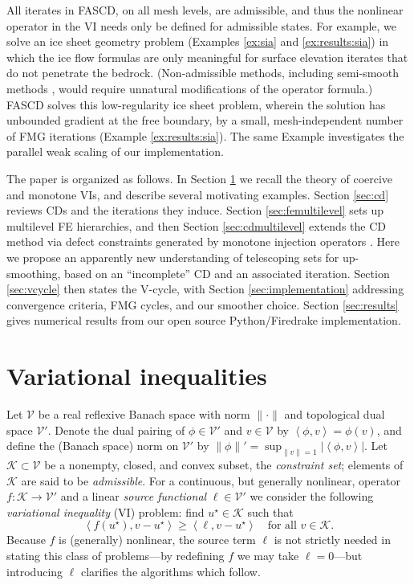 \documentclass[review,hidelinks,onefignum,onetabnum]{siamart220329}
\newcommand{\cK}{\mathcal{K}}
\newcommand{\cV}{\mathcal{V}}
\newcommand{\ip}[2]{\left<#1,#2\right>}
\begin{document}
All iterates in FASCD, on all mesh levels, are admissible, and thus the nonlinear operator in the VI needs only be defined for admissible states.  For example, we solve an ice sheet geometry problem (Examples \ref{ex:sia} and \ref{ex:results:sia}) in which the ice flow formulas are only meaningful for surface elevation iterates that do not penetrate the bedrock.  (Non-admissible methods, including semi-smooth methods \cite{BensonMunson2006}, would require unnatural modifications of the operator formula.)  FASCD solves this low-regularity ice sheet problem, wherein the solution has unbounded gradient at the free boundary, by a small, mesh-independent number of FMG iterations (Example \ref{ex:results:sia}). The same Example investigates the parallel weak scaling \cite{Bueler2021} of our implementation.

The paper is organized as follows.  In Section \ref{sec:vi} we recall the theory of coercive and monotone VIs, and describe several motivating examples.  Section \ref{sec:cd} reviews CDs and the iterations they induce.  Section \ref{sec:femultilevel} sets up multilevel FE hierarchies, and then Section \ref{sec:cdmultilevel} extends the CD method via defect constraints generated by monotone injection operators \cite{GraeserKornhuber2009}.  Here we propose an apparently new understanding of telescoping sets for up-smoothing, based on an ``incomplete'' CD and an associated iteration.  Section \ref{sec:vcycle} then states the V-cycle, with Section \ref{sec:implementation} addressing convergence criteria, FMG cycles, and our smoother choice.  Section \ref{sec:results} gives numerical results from our open source Python/Firedrake \cite{Rathgeberetal2016} implementation.


\section{Variational inequalities} \label{sec:vi}

Let $\cV$ be a real reflexive Banach space with norm $\|\cdot\|$ and topological dual space $\cV'$.  Denote the dual pairing of $\phi \in \cV'$ and $v\in\cV$ by $\ip{\phi}{v} = \phi(v)$, and define the (Banach space) norm on $\cV'$ by $\|\phi\|' = \sup_{\|v\|=1} |\!\ip{\phi}{v}\!|$.  Let $\cK \subset \cV$ be a nonempty, closed, and convex subset, the \emph{constraint set}; elements of $\cK$ are said to be \emph{admissible}.  For a continuous, but generally nonlinear, operator $f:\cK \to \cV'$ and a linear \emph{source functional} $\ell\in \cV'$ we consider the following \emph{variational inequality} (VI) problem: find $u^\star\in \cK$ such that
\begin{equation}
\ip{f(u^\star)}{v-u^\star} \ge \ip{\ell}{v-u^\star} \quad \text{for all } v\in \cK. \label{eq:vi}
\end{equation}
Because $f$ is (generally) nonlinear, the source term $\ell$ is not strictly needed in stating this class of problems---by redefining $f$ we may take $\ell=0$---but introducing $\ell$ clarifies the algorithms which follow.
\end{document}
